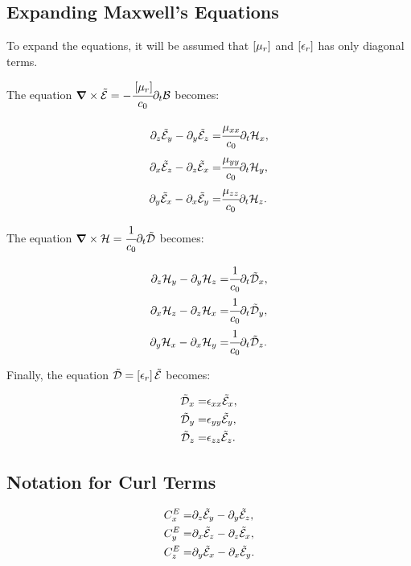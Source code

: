 \subsection{Expanding Maxwell's Equations}

To expand the equations, it will be assumed that $\brackets{\mu_r}$ and $\brackets{\epsilon_r}$ has only diagonal terms. 

The equation $\rot \En = - \cfrac{\brackets{\mu_r}}{c_0} \partial _t \Bt$ becomes:

\begin{eqnarray}
    \partial_z\tilde{\mathcal{E}}_y - \partial_y\tilde{\mathcal{E}}_z =& \cfrac{\mu_{xx}}{c_0} \partial_t \mathcal{H}_x, \\
    \partial_x\tilde{\mathcal{E}}_z - \partial_z\tilde{\mathcal{E}}_x =& \cfrac{\mu_{yy}}{c_0} \partial_t \mathcal{H}_y,\\
    \partial_y\tilde{\mathcal{E}}_x - \partial_x\tilde{\mathcal{E}}_y =& \cfrac{\mu_{zz}}{c_0} \partial_t \mathcal{H}_z.
\end{eqnarray}

The equation $\bm{\nabla}\times \mathcal{H} = \cfrac{1}{c_0} \partial _t \tilde{\mathcal{D}}$ becomes:

\begin{eqnarray}
    \partial_z\mathcal{H}_y - \partial_y\mathcal{H}_z =& \cfrac{1}{c_0} \partial_t \tilde{\mathcal{D}}_x, \\
    \partial_x\mathcal{H}_z - \partial_z\mathcal{H}_x =& \cfrac{1}{c_0} \partial_t \tilde{\mathcal{D}}_y, \\
    \partial_y\mathcal{H}_x - \partial_x\mathcal{H}_y =& \cfrac{1}{c_0} \partial_t \tilde{\mathcal{D}}_z.
\end{eqnarray}

Finally, the equation $ \Dn = \brackets{\epsilon_r} \En $ becomes:

\begin{eqnarray}
    \tilde{\mathcal{D}}_x =& \epsilon_{xx} \tilde{\mathcal{E}}_x, \\
    \tilde{\mathcal{D}}_y =& \epsilon_{yy} \tilde{\mathcal{E}}_y, \\
    \tilde{\mathcal{D}}_z =& \epsilon_{zz} \tilde{\mathcal{E}}_z.
\end{eqnarray}

\subsection{Notation for Curl Terms}

\begin{eqnarray}
    C_x^E =& \partial_z\tilde{\mathcal{E}}_y - \partial_y\tilde{\mathcal{E}}_z, \\
    C_y^E =& \partial_x\tilde{\mathcal{E}}_z - \partial_z\tilde{\mathcal{E}}_x, \\
    C_z^E =& \partial_y\tilde{\mathcal{E}}_x - \partial_x\tilde{\mathcal{E}}_y.
\end{eqnarray}

